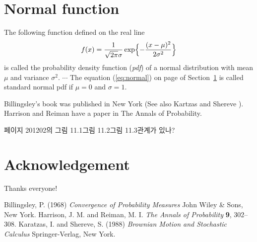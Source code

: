 \documentclass[11pt]{article}
\begin{document}
\tableofcontents
{}

\section{Normal function} \label{ss:normal}
The following function defined on the real line
\begin{equation} \label{eq:normal}
f(x) = \frac{1}{\sqrt{2\pi}\sigma} \exp\Bigl\{-\frac{(x-\mu)^2}{2\sigma^2}\Bigr\}
\end{equation}
is called the probability density function (\emph{pdf}) of a normal distribution with mean $\mu$ and variance $\sigma^2$.
$\cdots$ The equation (\ref{eq:normal}) on page \pageref{eq:normal} of Section~\ref{ss:normal} is called standard normal pdf if $\mu=0$ and $\sigma=1$.

Billingsley's \cite[see Cahpter~5]{bill1} book was published in New York (See also Kartzas and Shereve \cite[Optional]{KandS}). Harrison and Reiman \cite{HandR} have a paper in The Annals of Probability.

페이지 201\와 202의 그림 11.1\과 그림 11.2\는 그림 11.3\와 관계가 있나?

\section*{Acknowledgement}
Thanks everyone!

\begin{thebibliography}{12345}
 Billingsley, P. (1968) \emph{Convergence of Probability Measures} John Wiley \& Sons, New York.
 Harrison, J. M. and Reiman, M. I. \emph{The Annals of Probability} \textbf{9}, 302--308.
 Karatzas, I. and Shereve, S. (1988) \emph{Brownian Motion and Stochastic Calculus} Springer-Verlag, New York.
\end{thebibliography}
 
 
\end{document}
